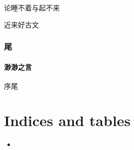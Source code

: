 \documentclass[letterpaper,10pt,english]{sphinxmanual}
\begin{document}
论睡不着与起不来

近来好古文


\subsection{尾}
\label{\detokenize{poem/END:id5}}\label{\detokenize{poem/END::doc}}\label{\detokenize{poem/END:id1}}

\subsubsection{渺渺之言}
\label{\detokenize{poem/END:id2}}
序尾


\chapter{Indices and tables}
\label{\detokenize{index:indices-and-tables}}\label{\detokenize{index:id3}}\begin{itemize}
\item {} 

\end{itemize}



\renewcommand{\indexname}{Index}
\printindex
\end{document}
